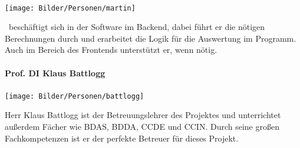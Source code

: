 \paragraph{\schneider}
\begin{minipage}{0.37\textwidth}
	\centering
	\texttt{[image: Bilder/Personen/martin]}
\end{minipage}
\hfill
\begin{minipage}{0.6\textwidth}
    \schneider \ beschäftigt sich in der Software im Backend, dabei führt er die nötigen Berechnungen durch und erarbeitet die Logik für die Auswertung im Programm. Auch im Bereich des Frontends unterstützt er, wenn nötig.
\end{minipage}%
\vspace{1ex}

\paragraph{Prof. DI Klaus Battlogg}
\begin{minipage}{0.37\textwidth}
	\centering
	\texttt{[image: Bilder/Personen/battlogg]}
\end{minipage}
\hfill
\begin{minipage}{0.6\textwidth}
	Herr Klaus Battlogg ist der Betreuungslehrer des Projektes und unterrichtet außerdem Fächer wie BDAS, BDDA, CCDE und CCIN. Durch seine großen Fachkompetenzen ist er der perfekte Betreuer für dieses Projekt.
\end{minipage}%
\vspace{1ex}

